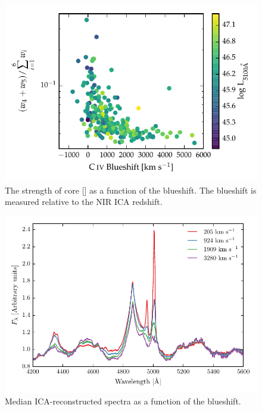 \begin{figure}
    \centering
    \includegraphics[width=\textwidth]{figures/chapter04/civ_blueshift_oiii_strength.pdf} 
    \caption{The strength of core [] as a function of the  blueshift. The  blueshift is measured relative to the NIR \ac{ICA} redshift.}     
    \label{fig:civ_blueshift_oiii_strength}
\end{figure}

\begin{figure}
    \centering
    \includegraphics[width=\columnwidth]{figures/chapter04/mfica_composites.pdf} 
    \caption{Median \ac{ICA}-reconstructed spectra as a function of the  blueshift.}     
    \label{fig:mfica_composites}
\end{figure}

